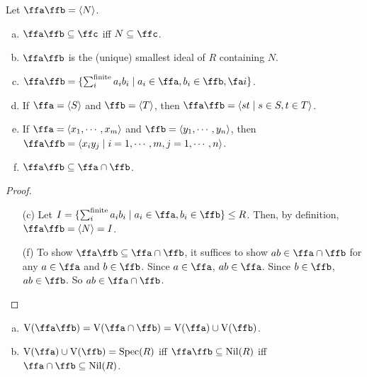 \begin{remark}[Fact]
    Let $\ffa \ffb = \langle N \rangle$.
    \begin{enumerate}[(a)]
        \item $\ffa \ffb \subseteq \ffc$ iff $N \subseteq \ffc$.
        \item $\ffa \ffb$ is the (unique) smallest ideal of $R$ containing $N$.
        \item $\ffa\ffb = \{\sum_{i}^{\text{finite}}a_ib_i \mid a_i \in \ffa,b_i \in \ffb,\fa i\}$.
        \item If $\ffa = \langle S \rangle$ and $\ffb = \langle T \rangle$, then $\ffa\ffb = \langle st \mid s \in S, t \in T\rangle$.
        \item If $\ffa = \langle x_1,\cdots,x_m \rangle$ and $\ffb = \langle y_1,\cdots,y_n \rangle$, then $\ffa\ffb = \langle x_iy_j \mid i = 1,\cdots,m,j = 1,\cdots,n \rangle$.
        \item $\ffa \ffb \subseteq \ffa \cap \ffb$.
    \end{enumerate}
\end{remark}

\begin{proof}
    \begin{enumerate}
        \item [(c)]
            Let $I = \{\sum_{i}^{\text{finite}} a_ib_i \mid a_i \in \ffa,b_i \in \ffb\} \leq R$. Then, by definition, $\ffa \ffb = \langle N \rangle = I$.
        \item [(f)]
            To show $\ffa \ffb \subseteq \ffa \cap \ffb$, it suffices to show $ab \in \ffa \cap \ffb$ for any $a \in \ffa$ and $b \in \ffb$. Since $a \in \ffa$, $ab \in \ffa$. Since $b \in \ffb$, $ab \in \ffb$. So $ab \in \ffa \cap \ffb$.
    \end{enumerate}
\end{proof}

\begin{proposition}
    \begin{enumerate}[(a)]
        \item 
            $\operatorname{V}(\ffa \ffb) = \operatorname{V}(\ffa \cap \ffb) = \operatorname{V}(\ffa) \cup \operatorname{V}(\ffb)$.
        \item 
            $\operatorname{V}(\ffa) \cup \operatorname{V}(\ffb) = \operatorname{Spec}(R)$ iff $\ffa \ffb \subseteq \operatorname{Nil}(R)$ iff $\ffa \cap \ffb \subseteq \operatorname{Nil}(R)$.
    \end{enumerate}
\end{proposition}

